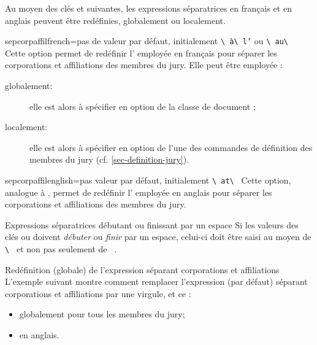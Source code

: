 Au moyen des clés  et 
suivantes, les expressions séparatrices en français et en anglais peuvent être
redéfinies, globalement ou localement.

\begin{docKey}{sepcorpaffilfrench}{=}{pas de valeur par défaut,
    initialement \lstinline[showspaces]+\ +\texttt{à}\lstinline[showspaces]+\ +\texttt{l'} ou
    \lstinline[showspaces]+\ au\ +}
  Cette option permet de redéfinir l' employée en français pour
  séparer les corporations et affiliations des membres du jury. Elle peut être
  employée :
  \begin{description}
  \item[globalement:] elle est alors à spécifier en option de la classe de
    document ;
  \item[localement:] elle est alors à spécifier en option de l'une des
    commandes de définition des membres du jury (cf.
    \vref{sec-definition-jury}).
  \end{description}
\end{docKey}

\begin{docKey}{sepcorpaffilenglish}{=}{pas valeur par
    défaut, initialement \lstinline[showspaces]+\ at\ +}
  Cette option, analogue à , permet de redéfinir
  l' employée en anglais pour séparer les corporations et
  affiliations des membres du jury.
\end{docKey}

\begin{dbwarning}{Expressions séparatrices débutant ou finissant par un espace}{}
  Si les valeurs des clés  ou
   doivent \emph{débuter} ou \emph{finir} par un
  espace, celui-ci doit être saisi au moyen de
  \lstinline[showspaces]+\ +
  et non pas seulement de
  \lstinline[showspaces]+ +.
\end{dbwarning}

\begin{dbexample}{Redéfinition (globale) de l'expression séparant corporations
    et affiliations}{}
  L'exemple suivant montre comment remplacer l'expression (par défaut) séparant
  corporations et affiliations par une virgule, et ce :
  \begin{itemize}
  \item globalement pour tous les membres du jury;
  \item en anglais.
  \end{itemize}
\end{dbexample}

